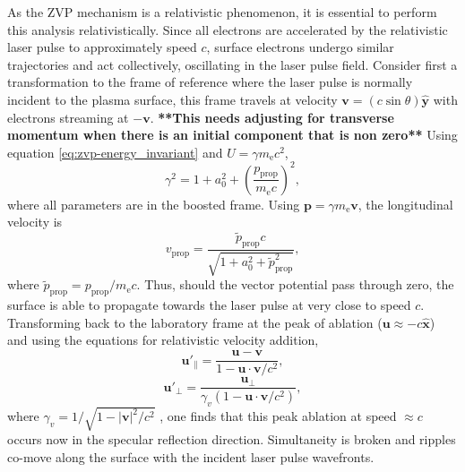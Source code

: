 As the \ac{ZVP} mechanism is a relativistic phenomenon, it is essential to perform this analysis relativistically. Since all electrons are accelerated by the relativistic laser pulse to approximately speed $c$, surface electrons undergo similar trajectories and act collectively, oscillating in the laser pulse field. Consider first a transformation to the frame of reference where the laser pulse is normally incident to the plasma surface, this frame travels at velocity $\mathbf{v} = (c\sin\theta )\hat{\mathbf{y}}$ with electrons streaming at $-\mathbf{v}$. 
\textbf{**This needs adjusting for transverse momentum when there is an initial component that is non zero**}
Using equation \ref{eq:zvp-energy_invariant} and $U = \gamma m_\mathrm{e} c^2$,
\begin{equation}
	\gamma^2 = 1 + a^2_0 + \left(\frac{p_\mathrm{prop}}{m_\mathrm{e}c}\right)^2,
\end{equation}
where all parameters are in the boosted frame. Using $\mathbf{p} = \gamma m_\mathrm{e} \mathbf{v}$, the longitudinal velocity is
\begin{equation}
	v_\mathrm{prop} = \frac{\tilde{p}_\mathrm{prop}c}{\sqrt{1 + a^2_0 + \tilde{p}^2_\mathrm{prop}}},
\end{equation}
where $\tilde{p}_\mathrm{prop} = p_\mathrm{prop}/m_\mathrm{e}c$. Thus, should the vector potential pass through zero, the surface is able to propagate towards the laser pulse at very close to speed $c$. Transforming back to the laboratory frame at the peak of ablation ($\mathbf{u}\approx -c\hat{\mathbf{x}}$) and using the equations for relativistic velocity addition,
\begin{equation}\label{eq:zvp_velocityaddition1}
	\mathbf{u}'_{\|} = \frac{\mathbf{u}-\mathbf{v}}{1- \mathbf{u}\cdot\mathbf{v}/c^2},
\end{equation}
\begin{equation}\label{eq:zvp_velocityaddition2}
	\mathbf{u}'_{\perp} = \frac{\mathbf{u}_\perp}{\gamma_v(1- \mathbf{u}\cdot\mathbf{v}/c^2)},
\end{equation}
where $\gamma_v = 1/\sqrt{1-|\mathbf{v}|^2/c^2}$ \cite{steaneRelativityMadeRelatively2012}, one finds that this peak ablation at speed $\approx c$ occurs now in the specular reflection direction. Simultaneity is broken and ripples co-move along the surface with the incident laser pulse wavefronts.

